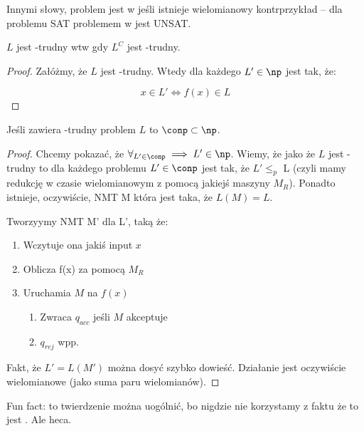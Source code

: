 Innymi słowy, problem jest w \conp jeśli istnieje wielomianowy kontrprzykład -- dla problemu SAT problemem w \conp jest UNSAT.

\begin{theorem}
	\(L\) jest \np-trudny wtw gdy \(L^C\) jest \conp-trudny.
\end{theorem}

\begin{proof}
	Załóżmy, że $L$ jest \np-trudny. Wtedy dla każdego \(L' \in \np\) jest tak, że:

	\begin{equation*}
		x \in L' \iff f(x) \in L
	\end{equation*}

\end{proof}

\begin{theorem}
	Jeśli \np zawiera \conp-trudny problem \( L \) to \( \conp \subset \np \).
\end{theorem}

\begin{proof}
	Chcemy pokazać, że \( \forall_{L' \in \conp} \implies L' \in \np \).
	Wiemy, że jako że \(L\) jest \conp-trudny to dla każdego problemu \(L' \in \conp\) jest tak, że \(L' \leq_p \) L (czyli mamy redukcję w czasie wielomianowym z pomocą jakiejś maszyny \(M_R\)). Ponadto istnieje, oczywiście, NMT M która jest taka, że \(L(M) = L \).

	Tworzyymy NMT M' dla L', taką że:

	\begin{enumerate}
		\item Wczytuje ona jakiś input \(x\)
		\item Oblicza f(x) za pomocą \(M_R\)
		\item Uruchamia \(M\) na \(f(x)\)

		      \begin{enumerate}
			      \item Zwraca \(q_{acc}\) jeśli \(M\) akceptuje
			      \item \(q_{rej} \) wpp.
		      \end{enumerate}
	\end{enumerate}

	Fakt, że \( L' = L(M') \) można dosyć szybko dowieść. Działanie jest oczywiście wielomianowe (jako suma paru wielomianów).

\end{proof}

Fun fact: to twierdzenie można uogólnić, bo nigdzie nie korzystamy z faktu że to jest \conp. Ale heca.


